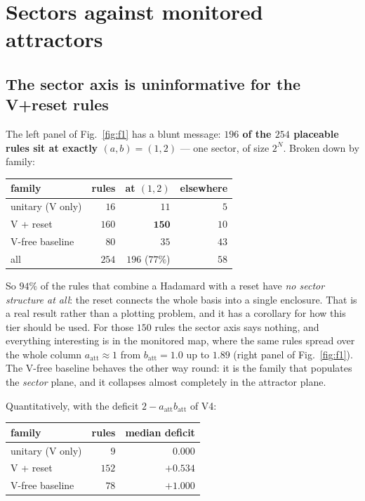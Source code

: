 \documentclass[11pt]{article}
\newcommand{\att}{\mathrm{att}}
\theoremstyle{plain}
\theoremstyle{definition}
\begin{document}
\section{Sectors against monitored attractors}
\label{sec:contrast}

\subsection{The sector axis is uninformative for the V+reset rules}
\label{sec:pileup}

The left panel of Fig.~\ref{fig:f1} has a blunt message: \textbf{$196$ of the $254$
placeable rules sit at exactly $(a,b)=(1,2)$} --- one sector, of size $2^N$. Broken down by
family:

\begin{center}
\begin{tabular}{lrrr}
\toprule
family & rules & at $(1,2)$ & elsewhere \\
\midrule
unitary (V only) & $16$ & $11$ & $5$ \\
V + reset & $160$ & $\mathbf{150}$ & $10$ \\
V-free baseline & $80$ & $35$ & $43$ \\
\midrule
all & $254$ & $196$ ($77\%$) & $58$ \\
\bottomrule
\end{tabular}
\end{center}

\noindent So $94\%$ of the rules that combine a Hadamard with a reset have
\emph{no sector structure at all}: the reset connects the whole basis into a
single enclosure. That is a real result rather than a plotting problem, and it
has a corollary for how this tier should be used. For those $150$ rules the
sector axis says nothing, and everything interesting is in the monitored map,
where the same rules spread over the whole column $a_\att\approx1$ from
$b_\att=1.0$ up to $1.89$ (right panel of Fig.~\ref{fig:f1}). The V-free
baseline behaves the other way round: it is the family that populates the
\emph{sector} plane, and it collapses almost completely in the attractor plane.

Quantitatively, with the deficit $2-a_\att b_\att$ of V4:

\begin{center}
\begin{tabular}{lrr}
\toprule
family & rules & median deficit \\
\midrule
unitary (V only) & $9$ & $0.000$ \\
V + reset & $152$ & $+0.534$ \\
V-free baseline & $78$ & $+1.000$ \\
\bottomrule
\end{tabular}
\end{center}
\end{document}
